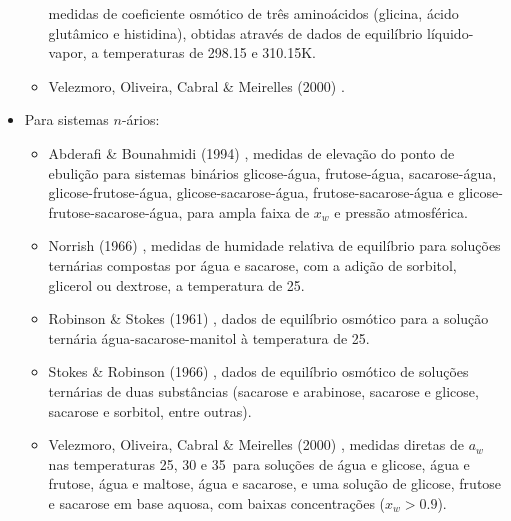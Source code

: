 \documentclass[
	12pt,				%
	openright,
	twoside,
	a4paper,			%
	english,			%
	french,				%
	brazil				%
	]{abntex2}
\begin{document}
\begin{itemize}
\begin{itemize}
				medidas de coeficiente osmótico de três aminoácidos
				(glicina, ácido glutâmico e histidina), obtidas
				através de dados de equilíbrio líquido-vapor, a
				temperaturas de 298.15 e 310.15K.
			\item Velezmoro, Oliveira, Cabral \& Meirelles (2000)
				\cite{velezmoro2000}.
		\end{itemize}
	\item Para sistemas $n$-ários:
		\begin{itemize}
			\item Abderafi \& Bounahmidi (1994) \cite{abderafi1994},
				medidas de elevação do ponto de ebulição
				para sistemas binários glicose-água,
				frutose-água, sacarose-água,
				glicose-frutose-água, glicose-sacarose-água,
				frutose-sacarose-água e
				glicose-frutose-sacarose-água, para ampla
				faixa de $x_w$ e pressão atmosférica.
			\item Norrish (1966) \cite{norrish1966}, medidas de
				humidade relativa de equilíbrio para soluções
				ternárias compostas por água e sacarose, com a
				adição de sorbitol, glicerol ou dextrose, a
				temperatura de 25\textcelsius.
			\item Robinson \& Stokes (1961) \cite{stokes1961},
				dados de equilíbrio osmótico para a solução
				ternária água-sacarose-manitol à temperatura
				de 25\textcelsius.
			\item Stokes \& Robinson (1966) \cite{stokes1966},
				dados de equilíbrio osmótico de soluções
				ternárias de duas substâncias (sacarose e
				arabinose, sacarose e glicose, sacarose e
				sorbitol, entre outras).
			\item Velezmoro, Oliveira, Cabral \& Meirelles (2000)
				\cite{velezmoro2000}, medidas diretas de $a_w$ nas
				temperaturas 25, 30 e 35\textcelsius\ para soluções
				de água e glicose, água e frutose, água e maltose,
				água e sacarose, e uma solução de glicose, frutose
				e sacarose em base aquosa, com baixas concentrações
				($x_w > 0.9$).
		\end{itemize}
\end{itemize}
\end{document}
